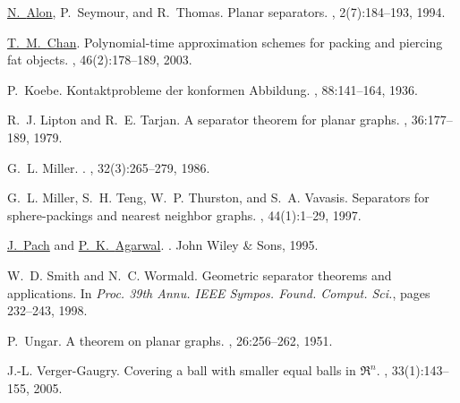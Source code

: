 \documentclass[12pt]{article}
\theoremstyle{remark}\theoremheaderfont{\sf}\theorembodyfont{\upshape}\newtheorem{defn}[theorem]{Definition}
\renewcommand{\Re}{\mathbb{R}}
\begin{document}
\begin{thebibliography}{MTTV97}

\href{http://www.math.tau.ac.il/~nogaa/}{N.~{Alon}}, P.~Seymour, and R.~Thomas.
\newblock Planar separators.
, 2(7):184--193, 1994.

\href{http://www.math.uwaterloo.ca/~tmchan/}{T.~M.~{Chan}}.
\newblock Polynomial-time approximation schemes for packing and piercing fat
  objects.
, 46(2):178--189, 2003.

P.~Koebe.
\newblock Kontaktprobleme der konformen {Abbildung}.
, 88:141--164, 1936.

R.~J. Lipton and R.~E. Tarjan.
\newblock A separator theorem for planar graphs.
, 36:177--189, 1979.

G.~L. Miller.
.
, 32(3):265--279, 1986.

G.~L. Miller, S.~H. Teng, W.~P. Thurston, and S.~A. Vavasis.
\newblock Separators for sphere-packings and nearest neighbor graphs.
, 44(1):1--29, 1997.

\href{http://www.math.nyu.edu/~pach}{J.~{Pach}} and \href{http://www.cs.duke.edu/~pankaj}{P.~K.~{Agarwal}}.
.
\newblock John Wiley \& Sons, 1995.

W.~D. Smith and N.~C. Wormald.
\newblock Geometric separator theorems and applications.
\newblock In {\em Proc. 39th Annu. IEEE Sympos. Found. Comput. Sci.\CNFFOCS},
  pages 232--243, 1998.

P.~Ungar.
\newblock A theorem on planar graphs.
, 26:256--262, 1951.

J.-L. {Verger-Gaugry}.
\newblock Covering a ball with smaller equal balls in {$\Re^n$}.
, 33(1):143--155, 2005.

\end{thebibliography}
\end{document}
